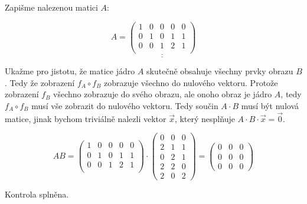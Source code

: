 \documentclass[12pt]{article}
\begin{document}
\begin{enumerate}
    Zapišme nalezenou matici $A$:

    \[
      A = \underline{\underline{\left(\begin{array}{ccccc}
        1 & 0 & 0 & 0 & 0 \\
        0 & 1 & 0 & 1 & 1 \\
        0 & 0 & 1 & 2 & 1 \\
      \end{array}\right)}}
    \]

    Ukažme pro jistotu, že matice jádro $A$ skutečně obsahuje všechny prvky obrazu $B$.
    Tedy že zobrazení $f_A\circ f_B$ zobrazuje všechno do nulového vektoru.
    Protože zobrazení $f_B$ všechno zobrazuje do svého obrazu, ale onoho obraz je jádro $A$,
    tedy $f_A\circ f_B$ musí vše zobrazit do nulového vektoru.
    Tedy součin $A\cdot B$ musí být nulová matice, jinak bychom triviálně nalezli
    vektor $\vec{x}$, který nesplňuje $A\cdot B \cdot \vec{x} = \vec{0}$.

    \[
      AB = \left(\begin{array}{ccccc}
        1 & 0 & 0 & 0 & 0 \\
        0 & 1 & 0 & 1 & 1 \\
        0 & 0 & 1 & 2 & 1 \\
      \end{array}\right) \cdot \left(\begin{array}{ccccc}
        0 & 0 & 0 \\ 2 & 1 & 1 \\ 0 & 2 & 1 \\ 2 & 2 & 0 \\ 2 & 0 & 2
      \end{array}\right) = \left(\begin{array}{ccc}
        0 & 0 & 0 \\ 0 & 0 & 0 \\ 0 & 0 & 0
      \end{array}\right)
    \]

    Kontrola splněna.

\end{enumerate}
\end{document}
